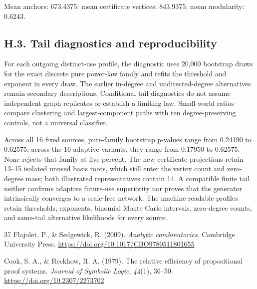 \documentclass[pdflatex,sn-basic,Numbered]{sn-jnl}
\begin{document}
\endgroup

Mean anchors: 673.4375; mean certificate vertices: 843.9375; mean modularity: 0.6243.

\subsection*{H.3. Tail diagnostics and reproducibility}\label{h.3.-tail-diagnostics-and-reproducibility}

For each outgoing distinct-use profile, the diagnostic uses 20,000 bootstrap draws for the exact discrete pure power-law family and refits the threshold and exponent in every draw. The earlier in-degree and undirected-degree alternatives remain secondary descriptions. Conditional tail diagnostics do not assume independent graph replicates or establish a limiting law. Small-world ratios compare clustering and largest-component paths with ten degree-preserving controls, not a universal classifier.

Across all 16 fixed sources, pure-family bootstrap p-values range from 0.24190 to 0.62575; across the 16 adaptive variants, they range from 0.17950 to 0.62575. None rejects that family at five percent. The new certificate projections retain 13--15 isolated unused basis roots, which still enter the vertex count and zero-degree mass; both illustrated representatives contain 14. A compatible finite tail neither confirms adaptive future-use superiority nor proves that the generator intrinsically converges to a scale-free network. The machine-readable profiles retain thresholds, exponents, binomial Monte Carlo intervals, zero-degree counts, and same-tail alternative likelihoods for every source.

\clearpage
\begin{thebibliography}{37}
 Flajolet, P., \& Sedgewick, R. (2009). \emph{Analytic combinatorics}. Cambridge University Press. \url{https://doi.org/10.1017/CBO9780511801655}

 Cook, S. A., \& Reckhow, R. A. (1979). The relative efficiency of propositional proof systems. \emph{Journal of Symbolic Logic}, \emph{44}(1), 36--50. \url{https://doi.org/10.2307/2273702}

\end{thebibliography}
\end{document}
